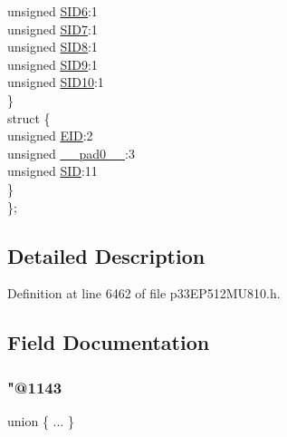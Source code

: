 \begin{DoxyCompactItemize}
\begin{tabbing}
\>\>unsigned \hyperlink{structtag_c2_r_x_f5_s_i_d_b_i_t_s_a70d70952133eb2389d5c326f9f0e8035}{SID6}:1\\
\>\>unsigned \hyperlink{structtag_c2_r_x_f5_s_i_d_b_i_t_s_a34097fb76decd431701fa2d86a22328e}{SID7}:1\\
\>\>unsigned \hyperlink{structtag_c2_r_x_f5_s_i_d_b_i_t_s_afe74894633244fdb0b0c01b4e8c522e7}{SID8}:1\\
\>\>unsigned \hyperlink{structtag_c2_r_x_f5_s_i_d_b_i_t_s_a33587704948067005c2a6a3ccc503c99}{SID9}:1\\
\>\>unsigned \hyperlink{structtag_c2_r_x_f5_s_i_d_b_i_t_s_a1a9084031c7f5fb16007feeebf0d8216}{SID10}:1\\
\>\} \\
\>struct \{\\
\>\>unsigned \hyperlink{structtag_c2_r_x_f5_s_i_d_b_i_t_s_ae80b378c9141f7c03e0b4e55b5f4b54d}{EID}:2\\
\>\>unsigned \hyperlink{structtag_c2_r_x_f5_s_i_d_b_i_t_s_adf71f3d8410c1f1dbbc96680a92c49af}{\_\_pad0\_\_}:3\\
\>\>unsigned \hyperlink{structtag_c2_r_x_f5_s_i_d_b_i_t_s_af88edf93b2fee2432665bd84f51287e4}{SID}:11\\
\>\} \\
\}; \\

\end{tabbing}\end{DoxyCompactItemize}


\subsection{Detailed Description}


Definition at line 6462 of file p33\+E\+P512\+M\+U810.\+h.



\subsection{Field Documentation}
\mbox{\label{structtag_c2_r_x_f5_s_i_d_b_i_t_s_a2c010b5ba0f9fd4e6683faa5d3c7a637}} 
\subsubsection{\texorpdfstring{"@1143}{@1143}}
{\footnotesize\ttfamily union \{ ... \} }

\mbox{\label{structtag_c2_r_x_f5_s_i_d_b_i_t_s_adf71f3d8410c1f1dbbc96680a92c49af}} 
